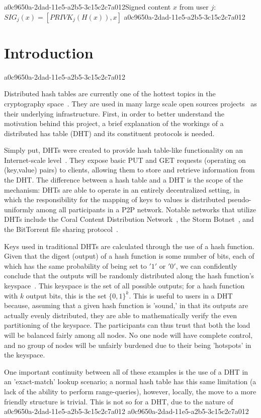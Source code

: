 \documentclass[12pt]{article}
\begin{document}
a0c9650a-2dad-11e5-a2b5-3c15c2c7a012Signed content $x$ from user $j$: $SIG_j(x) = \left[ PRIVK_j( H(x) ), x \right]$
a0c9650a-2dad-11e5-a2b5-3c15c2c7a012
\section{Introduction}
a0c9650a-2dad-11e5-a2b5-3c15c2c7a012\par Distributed hash tables are currently one of the hottest topics in the cryptography space~\cite{Stoica:2001dj,Rowstron:2001ea,Ratnasamy:2001wn}. They are used in many large scale open sources projects~\cite{Freitas:2013tb,Xu:2010vs,Perfitt:2010fh} as their underlying infrastructure. First, in order to better understand the motivation behind this project, a brief explanation of the workings of a distributed has table (DHT) and its constituent protocols is needed.

\par Simply put, DHTs were created to provide hash table-like functionality on an Internet-scale level~\cite{Ratnasamy:2001wn}. They expose basic PUT and GET requests (operating on (key,value) pairs) to clients, allowing them to store and retrieve information from the DHT. The difference between a hash table and a DHT is the scope of the mechanism: DHTs are able to operate in an entirely decentralized setting, in which the responsibility for the mapping of keys to values is distributed pseudo-uniformly among all participants in a P2P network. Notable networks that utilize DHTs include the Coral Content Distribution Network~\cite{Freedman:2004vb}, the Storm Botnet~\cite{Holz:2008uk}, and the BitTorrent file sharing protocol~\cite{Cohen:y1_8mBnw}.

\par Keys used in traditional DHTs are calculated through the use of a hash function. Given that the digest (output) of a hash function is some number of bits, each of which has the same probability of being set to $'1'$ or $'0'$, we can confidently conclude that the outputs will be randomly distributed along the hash function's keyspace~. This keyspace is the set of all possible outputs; for a hash function with $k$ output bits, this is the set $\{0,1\}^k$. This is useful to users in a DHT because, assuming that a given hash function is 'sound,' in that its outputs are actually evenly distributed, they are able to mathematically verify the even partitioning of the keyspace. The participants can thus trust that both the load will be balanced fairly among all nodes. No one node will have complete control, and no group of nodes will be unfairly burdened due to their being 'hotspots' in the keyspace.~

\par One important continuity between all of these examples is the use of a DHT in an 'exact-match' lookup scenario; a normal hash table has this same limitation (a lack of the ability to perform range-queries), however, locally, the move to a more friendly structure is trivial. This is not so for a DHT, due to the nature of
a0c9650a-2dad-11e5-a2b5-3c15c2c7a012\printbibliography
a0c9650a-2dad-11e5-a2b5-3c15c2c7a012
\end{document}
